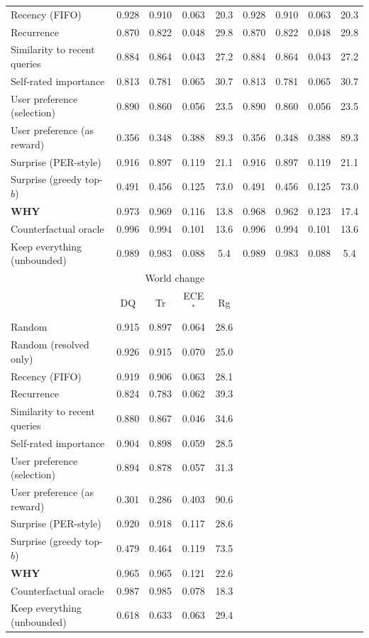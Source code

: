 \begin{table}[H]
\begin{tabular}{@{}lcccccccc@{}}
Recency (FIFO) & 0.928 & 0.910 & 0.063 & 20.3 & 0.928 & 0.910 & 0.063 & 20.3\\
Recurrence & 0.870 & 0.822 & 0.048 & 29.8 & 0.870 & 0.822 & 0.048 & 29.8\\
Similarity to recent queries & 0.884 & 0.864 & 0.043 & 27.2 & 0.884 & 0.864 & 0.043 & 27.2\\
Self-rated importance & 0.813 & 0.781 & 0.065 & 30.7 & 0.813 & 0.781 & 0.065 & 30.7\\
User preference (selection) & 0.890 & 0.860 & 0.056 & 23.5 & 0.890 & 0.860 & 0.056 & 23.5\\
User preference (as reward) & 0.356 & 0.348 & 0.388 & 89.3 & 0.356 & 0.348 & 0.388 & 89.3\\
Surprise (PER-style) & 0.916 & 0.897 & 0.119 & 21.1 & 0.916 & 0.897 & 0.119 & 21.1\\
Surprise (greedy top-$b$) & 0.491 & 0.456 & 0.125 & 73.0 & 0.491 & 0.456 & 0.125 & 73.0\\
\textbf{WHY} & 0.973 & 0.969 & 0.116 & 13.8 & 0.968 & 0.962 & 0.123 & 17.4\\
Counterfactual oracle & 0.996 & 0.994 & 0.101 & 13.6 & 0.996 & 0.994 & 0.101 & 13.6\\
Keep everything (unbounded) & 0.989 & 0.983 & 0.088 & 5.4 & 0.989 & 0.983 & 0.088 & 5.4\\
\midrule
 & \multicolumn{4}{c}{World change}\\
 & DQ & Tr & ECE$^\ast$ & Rg\\
\midrule
Random & 0.915 & 0.897 & 0.064 & 28.6 &  &  &  & \\
Random (resolved only) & 0.926 & 0.915 & 0.070 & 25.0 &  &  &  & \\
Recency (FIFO) & 0.919 & 0.906 & 0.063 & 28.1 &  &  &  & \\
Recurrence & 0.824 & 0.783 & 0.062 & 39.3 &  &  &  & \\
Similarity to recent queries & 0.880 & 0.867 & 0.046 & 34.6 &  &  &  & \\
Self-rated importance & 0.904 & 0.898 & 0.059 & 28.5 &  &  &  & \\
User preference (selection) & 0.894 & 0.878 & 0.057 & 31.3 &  &  &  & \\
User preference (as reward) & 0.301 & 0.286 & 0.403 & 90.6 &  &  &  & \\
Surprise (PER-style) & 0.920 & 0.918 & 0.117 & 28.6 &  &  &  & \\
Surprise (greedy top-$b$) & 0.479 & 0.464 & 0.119 & 73.5 &  &  &  & \\
\textbf{WHY} & 0.965 & 0.965 & 0.121 & 22.6 &  &  &  & \\
Counterfactual oracle & 0.987 & 0.985 & 0.078 & 18.3 &  &  &  & \\
Keep everything (unbounded) & 0.618 & 0.633 & 0.063 & 29.4 &  &  &  & \\
\midrule
\bottomrule
\end{tabular}
\end{table}
